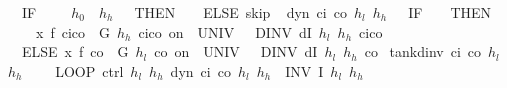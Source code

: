 \documentclass[envcountsame,envcountsect]{llncs}
\begin{document}
\begin{example}
\begin{isabellebody}
\ \ {\isacharparenleft}IF\ {\isacharparenleft}{\isasympi}\ {\isacharequal}\ {}\ {\isasymand}\ $h_0$\ {\isasymge}\ $h_h$\ {\isacharminus}\ {}{\isacharparenright}\ THEN\ {\isacharparenleft}{\isasympi}\ {\isacharcolon}{\isacharcolon}{\isacharequal}\ {}{\isacharparenright}\ ELSE\ skip{\isacharparenright}{\isacharparenright}{\isachardoublequoteclose}\isanewline
\isanewline
{}\ %
{\isachardoublequoteopen}dyn\ c\isactrlsub i\ c\isactrlsub o\ $h_l$\ $h_h$\ {\isasymtau}\ {\isasymequiv}\ IF\ {\isacharparenleft}{\isasympi}\ {\isacharequal}\ {}{\isacharparenright}\ THEN\ \isanewline
\ \ \ \ x{\isasymacute}{\isacharequal}\ f\ {\isacharparenleft}c\isactrlsub i{\isacharminus}c\isactrlsub o{\isacharparenright}\ {\isacharampersand}\ G\ $h_h$\ {\isacharparenleft}c\isactrlsub i{\isacharminus}c\isactrlsub o{\isacharparenright}\ on\ {\isacharbraceleft}{}{\isachardot}{\isachardot}{\isasymtau}{\isacharbraceright}\ UNIV\ {\isacharat}\ {}\ DINV\ {\isacharparenleft}dI\ $h_l$\ $h_h$\ {\isacharparenleft}c\isactrlsub i{\isacharminus}c\isactrlsub o{\isacharparenright}{\isacharparenright}\isanewline
\ \ ELSE\ x{\isasymacute}{\isacharequal}\ f\ {\isacharparenleft}{\isacharminus}c\isactrlsub o{\isacharparenright}\ {\isacharampersand}\ G\ $h_l$\ {\isacharparenleft}{\isacharminus}c\isactrlsub o{\isacharparenright}\ on\ {\isacharbraceleft}{}{\isachardot}{\isachardot}{\isasymtau}{\isacharbraceright}\ UNIV\ {\isacharat}\ {}\ DINV\ {\isacharparenleft}dI\ $h_l$\ $h_h$\ {\isacharparenleft}{\isacharminus}c\isactrlsub o{\isacharparenright}{\isacharparenright}{\isachardoublequoteclose}\isanewline
\isanewline
{}\isamarkupfalse%
\ {\isachardoublequoteopen}tank{\isacharunderscore}dinv\ c\isactrlsub i\ c\isactrlsub o\ $h_l$\ $h_h$\ {\isasymtau}\ {\isasymequiv}\isanewline 
\ \ LOOP\ {\isacharparenleft}ctrl\ $h_l$\ $h_h${\isacharsemicolon}\ dyn\ c\isactrlsub i\ c\isactrlsub o\ $h_l$\ $h_h$\ {\isasymtau}{\isacharparenright}\ INV\ {\isacharparenleft}I\ $h_l$\ $h_h${\isacharparenright}{\isachardoublequoteclose}\isanewline
\end{isabellebody}

\end{example}
\end{document}
